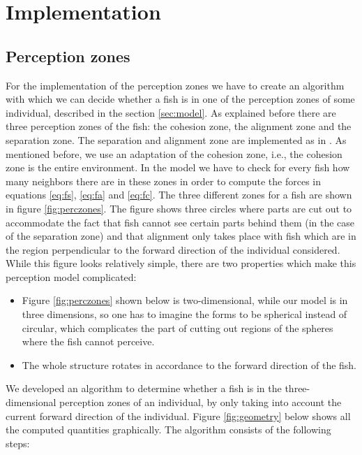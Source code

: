 \documentclass[11pt,a4paper]{article}
\begin{document}
\section{Implementation}
\label{sec:impl}

\subsection{Perception zones}
For the implementation of the perception zones we have to create an algorithm with which we can decide whether a fish is in one of the perception zones of some individual, described in the section \ref{sec:model}. As explained before there are three perception zones of the fish: the cohesion zone, the alignment zone and the separation zone. The separation and alignment zone are implemented as in \cite{hemelrijk}. As mentioned before, we use an adaptation of the cohesion zone, i.e., the cohesion zone is the entire environment. 
In the model we have to check for every fish how many neighbors there are in these zones in order to compute the forces in equations \ref{eq:fs}, \ref{eq:fa} and \ref{eq:fc}. The three different zones for a fish are shown in figure \ref{fig:perczones}. The figure shows three circles where parts are cut out to accommodate the fact that fish cannot see certain parts behind them (in the case of the separation zone) and that alignment only takes place with fish which are in the region perpendicular to the forward direction of the individual considered. While this figure looks relatively simple, there are two properties which make this perception model complicated:

\begin{itemize}
\item 
  Figure \ref{fig:perczones} shown below is two-dimensional, while our model is in three dimensions, so one has to imagine the forms to be spherical instead of circular, which complicates the part of cutting out regions of the spheres where the fish cannot perceive.
\item
  The whole structure rotates in accordance to the forward direction of the fish.
\end{itemize}

We developed an algorithm to determine whether a fish is in the three-dimensional perception zones of an individual, by only taking into account the current forward direction of the individual. Figure \ref{fig:geometry} below shows all the computed quantities graphically. The algorithm consists of the following steps:
\end{document}
